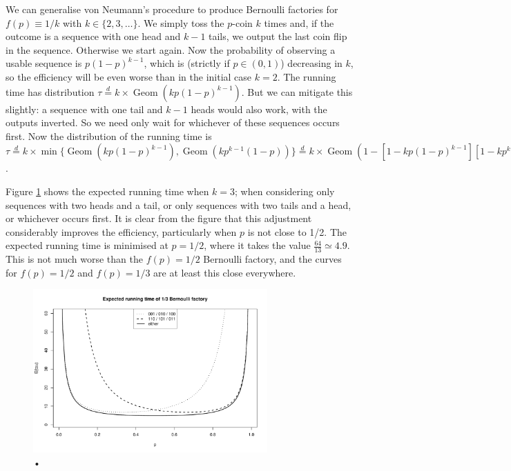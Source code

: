 \documentclass{article}
\theoremstyle{definition}
\newcommand{\eqdist}{\overset{d}{=}}
\newcommand{\Geom}{\operatorname{Geom}}
\begin{document}
We can generalise von Neumann's procedure to produce Bernoulli factories for $f(p)\equiv 1/k$ with $k\in\{2,3,\dots\}$. We simply toss the $p$-coin $k$ times and, if the outcome is a sequence with one head and $k-1$ tails, we output the last coin flip in the sequence. Otherwise we start again.
Now the probability of observing a usable sequence is $p(1-p)^{k-1}$, which is (strictly if $p\in(0,1)$) decreasing in $k$, so the efficiency will be even worse than in the initial case $k=2$. The running time has distribution $\tau \eqdist k \times \Geom(kp(1-p)^{k-1})$.
But we can mitigate this slightly: a sequence with one tail and $k-1$ heads would also work, with the outputs inverted. So we need only wait for whichever of these sequences occurs first. Now the distribution of the running time is $\tau \eqdist k \times \min\{\Geom(kp(1-p)^{k-1}), \Geom(kp^{k-1}(1-p))\} \eqdist k \times \Geom(1- [1-kp(1-p)^{k-1}][1-kp^{k-1}(1-p)])$.

Figure \ref{fig:runtime_const3} shows the expected running time when $k=3$; when considering only sequences with two heads and a tail, or only sequences with two tails and a head, or whichever occurs first.
It is clear from the figure that this adjustment considerably improves the efficiency, particularly when $p$ is not close to 1/2. The expected running time is minimised at $p=1/2$, where it takes the value $\frac{64}{13} \simeq 4.9$. This is not much worse than the $f(p)=1/2$ Bernoulli factory, and the curves for $f(p)=1/2$ and $f(p)=1/3$ are at least this close everywhere.\\

\begin{figure}
\centering
\includegraphics[width=0.8\textwidth]{const3_runtime.pdf}
\caption{•}
\label{fig:runtime_const3}
\end{figure}
\end{document}
